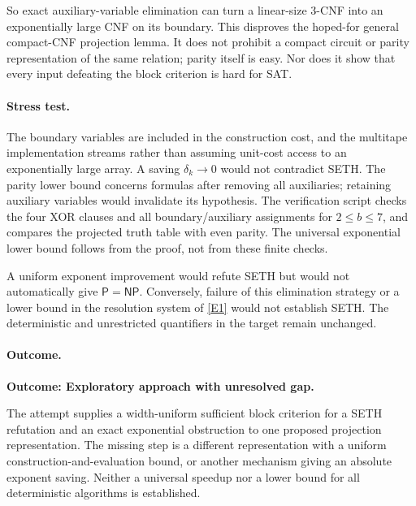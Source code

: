 \documentclass[11pt,a4paper]{article}
\newcommand{\eref}[2]{\hyperlink{extra:#1:#2}{[E#2]}}
\numberwithin{equation}{section}
\begin{document}
So exact auxiliary-variable elimination can turn a linear-size 3-CNF into an exponentially large CNF on its boundary. This disproves the hoped-for general compact-CNF projection lemma. It does not prohibit a compact circuit or parity representation of the same relation; parity itself is easy. Nor does it show that every input defeating the block criterion is hard for SAT.

\paragraph{Stress test.}
The boundary variables are included in the construction cost, and the multitape implementation streams rather than assuming unit-cost access to an exponentially large array. A saving $\delta_k\to0$ would not contradict SETH. The parity lower bound concerns formulas after removing all auxiliaries; retaining auxiliary variables would invalidate its hypothesis. The verification script checks the four XOR clauses and all boundary/auxiliary assignments for $2\le b\le7$, and compares the projected truth table with even parity. The universal exponential lower bound follows from the proof, not from these finite checks.

A uniform exponent improvement would refute SETH but would not automatically give $\mathsf P=\mathsf{NP}$. Conversely, failure of this elimination strategy or a lower bound in the resolution system of \eref{30006704}{1} would not establish SETH. The deterministic and unrestricted quantifiers in the target remain unchanged.

\paragraph{Outcome.}
\textbf{Outcome: Exploratory approach with unresolved gap.}

The attempt supplies a width-uniform sufficient block criterion for a SETH refutation and an exact exponential obstruction to one proposed projection representation. The missing step is a different representation with a uniform construction-and-evaluation bound, or another mechanism giving an absolute exponent saving. Neither a universal speedup nor a lower bound for all deterministic algorithms is established.

\end{document}
